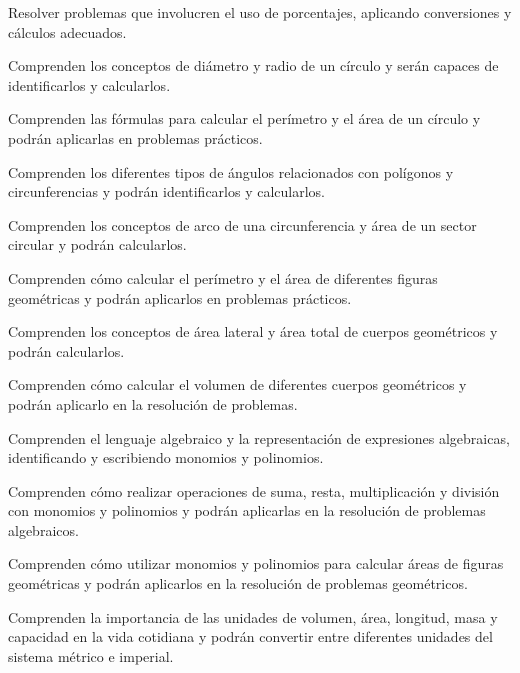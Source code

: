 \item Resolver problemas que involucren el uso de porcentajes, aplicando conversiones y cálculos adecuados.
\item Comprenden los conceptos de diámetro y radio de un círculo y serán capaces de identificarlos y calcularlos.
\item Comprenden las fórmulas para calcular el perímetro y el área de un círculo y podrán aplicarlas en problemas prácticos.
\item Comprenden los diferentes tipos de ángulos relacionados con polígonos y circunferencias y podrán identificarlos y calcularlos.
\item Comprenden los conceptos de arco de una circunferencia y área de un sector circular y podrán calcularlos.
\item Comprenden cómo calcular el perímetro y el área de diferentes figuras geométricas y podrán aplicarlos en problemas prácticos.
\item Comprenden los conceptos de área lateral y área total de cuerpos geométricos y podrán calcularlos.
\item Comprenden cómo calcular el volumen de diferentes cuerpos geométricos y podrán aplicarlo en la resolución de problemas.
\item Comprenden el lenguaje algebraico y la representación de expresiones algebraicas, identificando y escribiendo monomios y polinomios.
\item Comprenden cómo realizar operaciones de suma, resta, multiplicación y división con monomios y polinomios y podrán aplicarlas en la resolución de problemas algebraicos.
\item Comprenden cómo utilizar monomios y polinomios para calcular áreas de figuras geométricas y podrán aplicarlos en la resolución de problemas geométricos.
\item Comprenden la importancia de las unidades de volumen, área, longitud, masa y capacidad en la vida cotidiana y podrán convertir entre diferentes unidades del sistema métrico e imperial.  